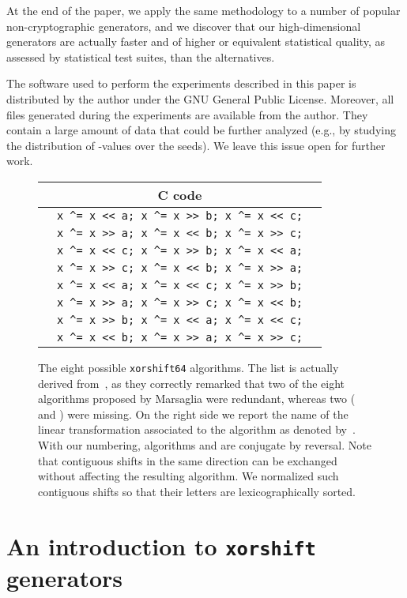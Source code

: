 \documentclass{acmsmalltr}
\newcommand{\xorshift}[1][]{\texttt{xorshift#1}\xspace}
\begin{document}
At the end of the paper, we apply the same methodology to a number of popular
non-cryptographic generators, and we discover that our high-dimensional
generators are actually faster and of higher or equivalent statistical quality,
as assessed by statistical test suites, than the alternatives.

The software used to perform the experiments described in this paper is
distributed by the author under the GNU General Public License. Moreover,
all files generated during the experiments are available from the author. They contain a large
amount of data that could be further analyzed (e.g., by studying the
distribution of -values over the seeds). We leave this issue open
for further work.

\begin{figure}
\centering
\begin{tabular}{l|c|l}
& C code & \\
\hline
 & \verb.x ^= x << a; x ^= x >> b; x ^= x << c;.  & \\
 & \verb.x ^= x >> a; x ^= x << b; x ^= x >> c;. & \\
 & \verb.x ^= x << c; x ^= x >> b; x ^= x << a;. & \\
 & \verb.x ^= x >> c; x ^= x << b; x ^= x >> a;. & \\
 & \verb.x ^= x << a; x ^= x << c; x ^= x >> b;. & \\
 & \verb.x ^= x >> a; x ^= x >> c; x ^= x << b;. & \\
 & \verb.x ^= x >> b; x ^= x << a; x ^= x << c;. & \\
 & \verb.x ^= x << b; x ^= x >> a; x ^= x >> c;. & 
\end{tabular}
\caption{\label{tab:algo}The eight possible \xorshift[64] algorithms.  
The list is actually derived from~\protect{},
as they correctly remarked that two of the eight algorithms proposed 
by Marsaglia were redundant, whereas two ( and ) were missing.
On the right side we report the name of the linear transformation associated to
the algorithm as denoted by~\protect{}. With our numbering,
algorithms  and  are conjugate by reversal. Note that contiguous shifts
in the same direction can be exchanged without affecting the resulting
algorithm. We normalized such contiguous shifts so that their letters are
lexicographically sorted.}
\end{figure}

\section{An introduction to \xorshift generators}
\end{document}
